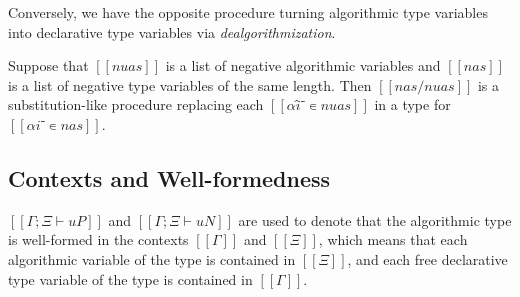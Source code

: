 \documentclass[acmsmall,natbib=false,review,anonymous]{acmart}
\begin{document}
Conversely, we have the opposite procedure turning algorithmic type variables
into declarative type variables via \emph{dealgorithmization}.

\begin{definition}
  Suppose that $[[nuas]]$ is a list of negative algorithmic variables
  and $[[nas]]$ is a list of negative type variables of the same length. 
  Then $[[ nas/nuas ]]$ is a substitution-like procedure replacing each
  $[[αî⁻ ∊ {nuas}]]$ in a type for $[[αi⁻ ∊ {nas}]]$.
\end{definition}


\subsection{Contexts and Well-formedness}


$[[Γ ; Ξ ⊢ uP]]$ and $[[Γ ; Ξ ⊢ uN]]$ are used to denote
that the algorithmic type is well-formed in the contexts
$[[Γ]]$ and $[[Ξ]]$, which means that each algorithmic variable
of the type is contained in $[[Ξ]]$, and each free declarative type variable
of the type is contained in $[[Γ]]$.

\begin{algorithm}
  \hfill
  
  \begin{multicols}{2}
  \ottdefnWFATNauWF{}
  \columnbreak

  \ottdefnWFATPauWF{}
  \end{multicols}

\end{algorithm}
\end{document}
